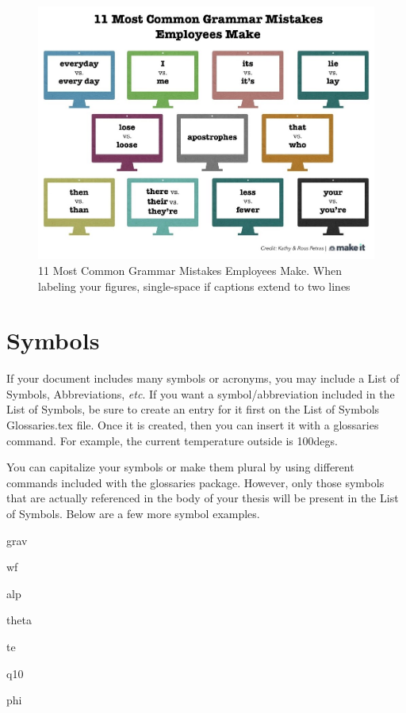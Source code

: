 \begin{figure}[ht]
    \centering
    \includegraphics[scale=.7]{Figures/figure 1.1.jpg}
    \caption[11 Most Common Grammar Mistakes Employees Make: I'm purposely making this longer to extend to two lines.]{11 Most Common Grammar Mistakes Employees Make. When labeling your figures, single-space if captions extend to two lines}
    \label{fig 1.1}
\end{figure}

\section{Symbols}

If your document includes many symbols or acronyms, you may include a List of Symbols, Abbreviations, \textit{etc}. If you want a symbol/abbreviation included in the List of Symbols, be sure to create an entry for it first on the List of Symbols Glossaries.tex file. Once it is created, then you can insert it with a glossaries command. For example, the current temperature outside is 100\glspl{deg}.

You can capitalize your symbols or make them plural by using different commands included with the glossaries package. However, only those symbols that are actually referenced in the body of your thesis will be present in the List of Symbols. Below are a few more symbol examples.

\gls{grav}

\gls{wf}

\gls{alp}

\gls{theta}

\gls{te}

\gls{q10}

\gls{phi}

